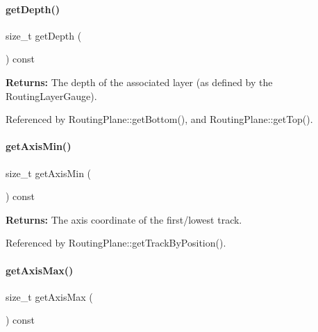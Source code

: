 \paragraph{\texorpdfstring{get\+Depth()}{getDepth()}}
{\footnotesize\ttfamily size\+\_\+t get\+Depth (\begin{DoxyParamCaption}{ }\end{DoxyParamCaption}) const\hspace{0.3cm}{\ttfamily [inline]}}

{\bfseries Returns\+:} The depth of the associated layer (as defined by the Routing\+Layer\+Gauge). 

Referenced by Routing\+Plane\+::get\+Bottom(), and Routing\+Plane\+::get\+Top().

\mbox{\label{classKite_1_1RoutingPlane_a9adcc1428480dd9a60454637c704207f}} 
\paragraph{\texorpdfstring{get\+Axis\+Min()}{getAxisMin()}}
{\footnotesize\ttfamily size\+\_\+t get\+Axis\+Min (\begin{DoxyParamCaption}{ }\end{DoxyParamCaption}) const\hspace{0.3cm}{\ttfamily [inline]}}

{\bfseries Returns\+:} The axis coordinate of the first/lowest track. 

Referenced by Routing\+Plane\+::get\+Track\+By\+Position().

\mbox{\label{classKite_1_1RoutingPlane_a1aa9568c234ed8b055c54f73c262690d}} 
\paragraph{\texorpdfstring{get\+Axis\+Max()}{getAxisMax()}}
{\footnotesize\ttfamily size\+\_\+t get\+Axis\+Max (\begin{DoxyParamCaption}{ }\end{DoxyParamCaption}) const\hspace{0.3cm}{\ttfamily [inline]}}


